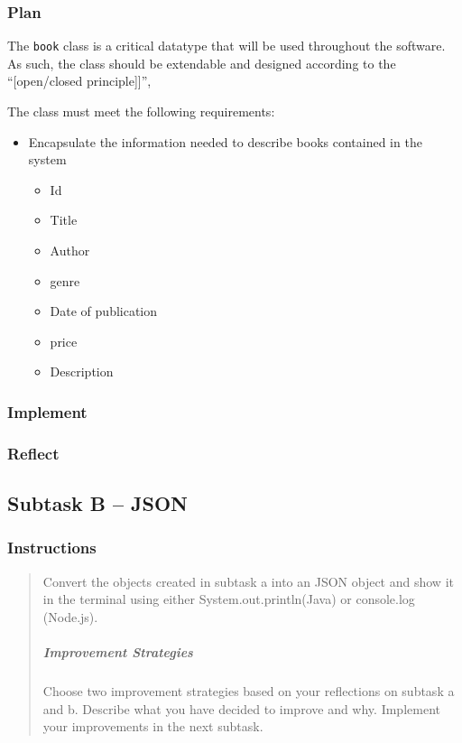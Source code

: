\subsubsection{Plan}\label{plan}

The \texttt{book} class is a critical datatype that will be used
throughout the software. As such, the class should be extendable and
designed according to the ``{[}open/closed principle{]}{]}'',

The class must meet the following requirements:

\begin{itemize}
\tightlist
\item
  Encapsulate the information needed to describe books contained in the
  system

  \begin{itemize}
  \tightlist
  \item
    Id
  \item
    Title
  \item
    Author
  \item
    genre
  \item
    Date of publication
  \item
    price
  \item
    Description
  \end{itemize}
\end{itemize}

\subsubsection{Implement}\label{implement}

\subsubsection{Reflect}\label{reflect}

\subsection{Subtask B -- JSON}\label{subtask-b-json}

\subsubsection{Instructions}\label{instructions-2}

\begin{quote}
Convert the objects created in subtask a into an JSON object and show it
in the terminal using either System.out.println(Java) or console.log
(Node.js).

\mbox{}%
\subparagraph{Improvement Strategies}\label{improvement-strategies}

Choose two improvement strategies based on your reflections on subtask a
and b. Describe what you have decided to improve and why. Implement your
improvements in the next subtask.
\end{quote}

